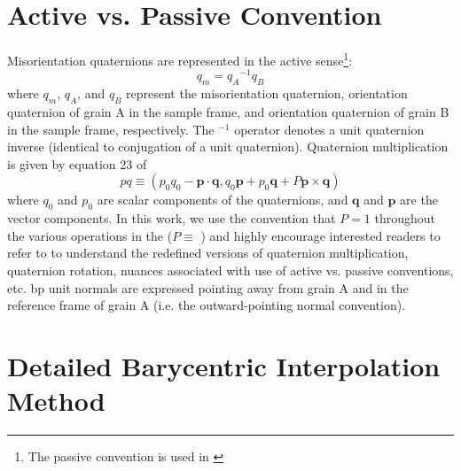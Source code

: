 \documentclass[final,twocolumn,12pt]{elsarticle}
\begin{document}
\begin{appendices}


\section{Active vs. Passive Convention}
\label{sec:app:convention}
Misorientation quaternions are represented in the active sense\footnote{The passive convention is used in \cite{francisGeodesicOctonionMetric2019}}:
\begin{equation}
    q_m = {q_A}^{-1}q_B
\end{equation}
where $q_m$, $q_A$, and $q_B$ represent the misorientation quaternion, orientation quaternion of grain A in the sample frame, and orientation quaternion of grain B in the sample frame, respectively. The $^{-1}$ operator denotes a unit quaternion inverse (identical to conjugation of a unit quaternion). Quaternion multiplication is given by equation 23 of \cite{rowenhorstConsistentRepresentationsConversions2015}
\begin{equation}
p q \equiv\left(p_{0} q_{0}-\mathbf{p} \cdot \mathbf{q}, q_{0} \mathbf{p}+p_{0} \mathbf{q}+P \mathbf{p} \times \mathbf{q}\right)
\end{equation}
where $q_0$ and $p_0$ are scalar components of the quaternions, and $\mathbf{q}$ and $\mathbf{p}$ are the vector components.
In this work, we use the convention that $P=1$ throughout the various operations in the \vfzorepo{} ($P \equiv $ ) and highly encourage interested readers to refer to \citet{rowenhorstConsistentRepresentationsConversions2015} to understand the redefined versions of quaternion multiplication, quaternion rotation, nuances associated with use of active vs. passive conventions, etc. \Gls{bp} unit normals are expressed pointing away from grain A and in the reference frame of grain A (i.e. the outward-pointing normal convention).

\section{Detailed Barycentric Interpolation Method}
\label{sec:app:bary}
\renewcommand\thefigure{\thesection.\arabic{figure}} 
\setcounter{figure}{0}


\end{appendices}
\end{document}
